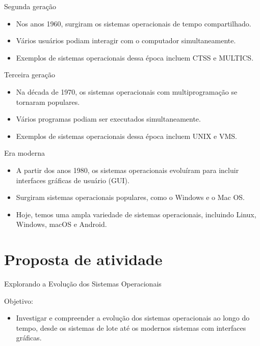 \documentclass{beamer}
\begin{document}
      
\begin{frame}{Segunda geração}\justifying
      \begin{itemize}
            \item Nos anos 1960, surgiram os sistemas operacionais de tempo compartilhado.
            \item Vários usuários podiam interagir com o computador simultaneamente.
            \item Exemplos de sistemas operacionais dessa época incluem CTSS e MULTICS.
          \end{itemize}
\end{frame}

\begin{frame}{Terceira geração}
      \begin{itemize}
            \item Na década de 1970, os sistemas operacionais com multiprogramação se tornaram populares.
            \item Vários programas podiam ser executados simultaneamente.
            \item Exemplos de sistemas operacionais dessa época incluem UNIX e VMS.
          \end{itemize}
\end{frame}

\begin{frame}{Era moderna}

      \begin{itemize}
            \item A partir dos anos 1980, os sistemas operacionais evoluíram para incluir interfaces gráficas de usuário (GUI).
            \item Surgiram sistemas operacionais populares, como o Windows e o Mac OS.
            \item Hoje, temos uma ampla variedade de sistemas operacionais, incluindo Linux, Windows, macOS e Android.
          \end{itemize}
      \end{frame}

\section{Proposta de atividade}

\begin{frame}{Explorando a Evolução dos Sistemas Operacionais}

      Objetivo:
      \begin{itemize}
            \item  Investigar e compreender a evolução dos sistemas operacionais ao longo do tempo, desde os sistemas de lote até os modernos sistemas com interfaces gráficas.
      \end{itemize}
      
\end{frame}

\backmatter
\end{document}
